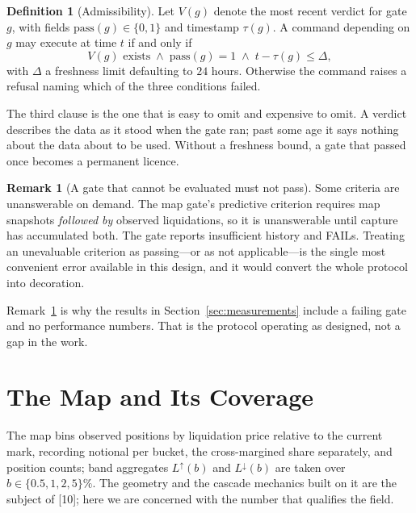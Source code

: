 \documentclass[11pt,a4paper]{article}
\theoremstyle{definition}
\newtheorem{definition}{Definition}[section]
\newtheorem{remark}{Remark}[section]
\theoremstyle{plain}
\begin{document}
\begin{definition}[Admissibility]
\label{def:admissible}
Let $V(g)$ denote the most recent verdict for gate $g$, with fields $\mathrm{pass}(g) \in \{0,1\}$
and timestamp $\tau(g)$. A command depending on $g$ may execute at time $t$ if and only if
\[
  V(g) \text{ exists}
  \;\wedge\;
  \mathrm{pass}(g) = 1
  \;\wedge\;
  t - \tau(g) \le \Delta,
\]
with $\Delta$ a freshness limit defaulting to $24$ hours. Otherwise the command raises a refusal
naming which of the three conditions failed.
\end{definition}

The third clause is the one that is easy to omit and expensive to omit. A verdict describes the data
as it stood when the gate ran; past some age it says nothing about the data about to be used. Without
a freshness bound, a gate that passed once becomes a permanent licence.

\begin{remark}[A gate that cannot be evaluated must not pass]
\label{rem:unevaluable}
Some criteria are unanswerable on demand. The map gate's predictive criterion requires map snapshots
\emph{followed by} observed liquidations, so it is unanswerable until capture has accumulated both.
The gate reports insufficient history and \textsf{FAIL}s. Treating an unevaluable criterion as
passing---or as not applicable---is the single most convenient error available in this design, and it
would convert the whole protocol into decoration.
\end{remark}

Remark~\ref{rem:unevaluable} is why the results in Section~\ref{sec:measurements} include a failing
gate and no performance numbers. That is the protocol operating as designed, not a gap in the work.

\section{The Map and Its Coverage}
\label{sec:map}

The map bins observed positions by liquidation price relative to the current mark, recording notional
per bucket, the cross-margined share separately, and position counts; band aggregates
$L^{\uparrow}(b)$ and $L^{\downarrow}(b)$ are taken over $b \in \{0.5, 1, 2, 5\}\%$. The geometry and
the cascade mechanics built on it are the subject of [10]; here we are concerned with the
number that qualifies the field.
\end{document}
